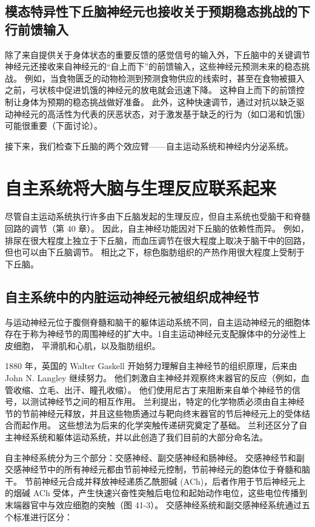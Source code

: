 \subsection{模态特异性下丘脑神经元也接收关于预期稳态挑战的下行前馈输入}

除了来自提供关于身体状态的重要反馈的感觉信号的输入外，下丘脑中的关键调节神经元还接收来自神经元的“自上而下”的前馈输入，这些神经元预测未来的稳态挑战。 例如，当食物匮乏的动物检测到预测食物供应的线索时，甚至在食物被摄入之前，弓状核中促进饥饿的神经元的放电就会迅速下降。 这种自上而下的前馈控制让身体为预期的稳态挑战做好准备。 此外，这种快速调节，通过对抗以缺乏驱动神经元的高活性为代表的厌恶状态，对于激发基于缺乏的行为（如口渴和饥饿）可能很重要（下面讨论）。

接下来，我们检查下丘脑的两个效应臂——自主运动系统和神经内分泌系统。

\section{自主系统将大脑与生理反应联系起来}
尽管自主运动系统执行许多由下丘脑发起的生理反应，但自主系统也受脑干和脊髓回路的调节（第 40 章）。 因此，自主神经功能因对下丘脑的依赖性而异。 例如，排尿在很大程度上独立于下丘脑，而血压调节在很大程度上取决于脑干中的回路，但也可以由下丘脑调节。 相比之下，棕色脂肪组织的产热作用很大程度上受制于下丘脑。

\subsection{自主系统中的内脏运动神经元被组织成神经节}
与运动神经元位于腹侧脊髓和脑干的躯体运动系统不同，自主运动神经元的细胞体存在于称为神经节的周围神经的扩大中。1自主运动神经元支配腺体中的分泌性上皮细胞， 平滑肌和心肌，以及脂肪组织。

1880 年，英国的 Walter Gaskell 开始努力理解自主神经节的组织原理，后来由 John N. Langley 继续努力。 他们刺激自主神经并观察终末器官的反应（例如，血管收缩、立毛、出汗、瞳孔收缩）。 他们使用尼古丁来阻断来自单个神经节的信号，以测试神经节之间的相互作用。 兰利提出，特定的化学物质必须由自主神经节的节前神经元释放，并且这些物质通过与靶向终末器官的节后神经元上的受体结合而起作用。 这些想法为后来的化学突触传递研究奠定了基础。 兰利还区分了自主神经系统和躯体运动系统，并以此创造了我们目前的大部分命名法。

自主神经系统分为三个部分：交感神经、副交感神经和肠神经。 交感神经节和副交感神经节中的所有神经元都由节前神经元控制，节前神经元的胞体位于脊髓和脑干。 节前神经元合成并释放神经递质乙酰胆碱 (ACh)，后者作用于节后神经元上的烟碱 ACh 受体，产生快速兴奋性突触后电位和起始动作电位，这些电位传播到末端器官中与效应细胞的突触（图 41-3）。 交感神经系统和副交感神经系统通过五个标准进行区分：

